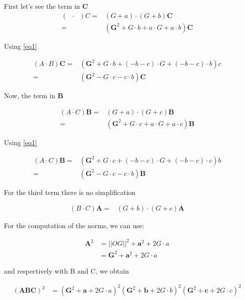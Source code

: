 \documentclass[10pt,a4paper]{article}
\newcommand{\ud}[1]{\underline{#1}}
\DeclareMathOperator{\A}{\ud{A}}
\DeclareMathOperator{\B}{\ud{B}}
\begin{document}
First let's see the term in $\mathbf{C}$
\begin{align*}
 \left({\A}\cdot {\B}\right)C
	=& \left( G + a \right) \cdot \left( G + b \right) \mathbf{C} \\
	 =& (\mathbf{G}^2 +  G \cdot b	+ a \cdot G + a \cdot b    ) \mathbf{C}
\end{align*}

Using \eqref{eq1}

\begin{align}
 \left({A}\cdot {B}\right)\mathbf{C}
	 =& (\mathbf{G}^2 +  G \cdot b	+ (-b - c) \cdot G + (-b - c) \cdot b    ) c \nonumber \\
	 =& (\mathbf{G}^2 - G \cdot c - c \cdot b)\mathbf{C}
\end{align}



Now, the term in $\mathbf{B}$


\begin{align*}
 \left({A}\cdot {C}\right)\mathbf{B} 
	=& \left( G + a \right) \cdot \left( G + c \right) \mathbf{B} \\
	 =& (\mathbf{G}^2 +  G \cdot c	+ a \cdot G + a \cdot c    ) \mathbf{B}
\end{align*}

Using \eqref{eq1}

\begin{align}
 \left({A}\cdot {C}\right)\mathbf{B}
	 =& (\mathbf{G}^2 +  G \cdot c	+ (-b - c) \cdot G + (-b - c) \cdot c    ) b \nonumber \\
	 =& (\mathbf{G}^2 - G \cdot c - c \cdot b)\mathbf{B}
\end{align}


For the third term there is no simplification

\begin{align}
 \left({B}\cdot {C}\right)\mathbf{A}
	=& \left( G + b \right) \cdot \left( G + c \right) \mathbf{A}
\end{align}


For the computation of the norms, we can use:

\begin{align*}
\mathbf{A}^2 &= ||OG||^2 + \mathbf{a}^2 + 2 G \cdot a \\
        &=  \mathbf{G}^2 + \mathbf{a}^2 + 2 G \cdot a 
\end{align*}

and respectively with B and C, we obtain


\begin{align}
(\mathbf{A}\mathbf{B}\mathbf{C})^2 &= (\mathbf{G}^2 + \mathbf{a} + 2 G \cdot a )^2(\mathbf{G}^2 + \mathbf{b} + 2 G \cdot b)^2(\mathbf{G}^2 + \mathbf{c} + 2 G \cdot c)^2 
\end{align}
\end{document}
